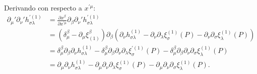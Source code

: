 \documentclass[letterpaper,11pt]{article}
\begin{document}
Derivando con respecto a $x^{'\mu}$:
\begin{align}
\partial_{\mu} ' \partial_{\nu} ' h_{\sigma\lambda}^{'(1)} &= \frac{\partial x^{\beta}}{\partial x^{' \mu}} \partial_{\beta} \partial_{\nu} '  h_{\sigma\lambda}^{'(1)} \nonumber \\
&= \left( \delta_{\mu}^{\beta} - \partial_{\mu} \xi^{\beta}_{(1)} \right) \partial_{\beta} \left( \partial_{\nu}h_{\sigma\lambda}^{(1)} - \partial_{\nu} \partial_{\lambda} \xi^{(1)}_{\sigma}(P) - \partial_{\nu}\partial_{\sigma} \xi_{\lambda}^{(1)}(P)   \right) \nonumber \\
&=  \delta_{\mu}^{\beta} \partial_{\beta} \partial_{\nu} h_{\sigma\lambda}^{(1)}  - \delta_{\mu}^{\beta} \partial_{\beta}   \partial_{\nu}  \partial_{\lambda} \xi^{'(1)}_{\sigma}(P) -  \delta_{\mu}^{\beta}\partial_{\beta} \partial_{\nu} \partial_{\sigma} \xi_{\lambda}^{(1)}(P)  \nonumber \\
&=  \partial_{\mu} \partial_{\nu} h_{\sigma\lambda}^{(1)} -  \partial_{\mu}  \partial_{\nu} \partial_{\lambda} \xi^{(1)}_{\sigma}(P) -  \partial_{\mu}  \partial_{\nu} \partial_{\sigma} \xi_{\lambda}^{(1)}(P). \label{eq:gauge-7}
\end{align}
\end{document}
